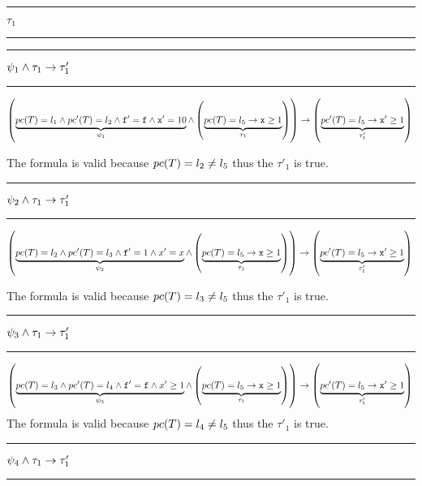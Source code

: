 \begin{center}\rule{4cm}{0.4pt}  $\tau_1$  \rule{4cm}{0.4pt}\end{center}
	
	\rule{1cm}{0.2pt} \;$\psi_1 \wedge \tau_1 \to \tau_1'$\; \rule{1cm}{0.2pt}
	

	\begin{dmath*}[indentstep={5em}]
		\left(
			\underbrace{\pc(T) = l_1 \andcond \pc'(T) = l_2 \andcond \mathtt{f'=f} \andcond \mathtt{x}' = 10}_{\psi_1} \andcond \left(\underbrace{\pc(T) = l_5 \to \mathtt{x}\geq 1}_{\tau_1}\right)
		\right) 
				\to\left(\underbrace{\pc'(T) = l_5 \to \mathtt{x}' \geq 1}_{\tau_1'}\right)\\\\
	\end{dmath*}

	The formula is valid because $pc(T) = l_2 \neq l_5$ thus the $\tau'_1$ is true.

	\rule{1cm}{0.2pt} \;$\psi_2 \wedge \tau_1 \to \tau_1'$\; \rule{1cm}{0.2pt}
	

	\begin{dmath*}[indentstep={5em}]
		\left(
			\underbrace{\pc(T) = l_2 \andcond \pc'(T) = l_3 \andcond \mathtt{f}' = 1 \andcond x'=x}_{\psi_2} \andcond \left(\underbrace{\pc(T) = l_5 \to \mathtt{x}\geq 1}_{\tau_1}\right)
		\right) 
			\to\left(\underbrace{\pc'(T) = l_5 \to \mathtt{x}' \geq 1}_{\tau_1'}\right)\\\\
	\end{dmath*}

	The formula is valid because $pc(T) = l_3 \neq l_5$ thus the $\tau'_1$ is true.

	\rule{1cm}{0.2pt} \;$\psi_3 \wedge \tau_1 \to \tau_1'$\; \rule{1cm}{0.2pt}
	

	\begin{dmath*}[indentstep={5em}]
		\left(
			\underbrace{\pc(T) = l_3 \andcond \pc'(T) = l_4 \andcond \mathtt{f'=f} \andcond x'\geq 1}_{\psi_3} \andcond \left(\underbrace{\pc(T) = l_5 \to \mathtt{x}\geq 1}_{\tau_1}\right)
		\right) 
			\to\left(\underbrace{\pc'(T) = l_5 \to \mathtt{x}' \geq 1}_{\tau_1'}\right)\\\\
	\end{dmath*}
		The formula is valid because $pc(T) = l_4 \neq l_5$ thus the $\tau'_1$ is true.

	\rule{1cm}{0.2pt} \;$\psi_4 \wedge \tau_1 \to \tau_1'$\; \rule{1cm}{0.2pt}


